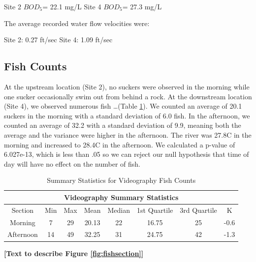 \documentclass{article}\usepackage[]{graphicx}\usepackage[]{color}
\begin{document}
\subitem Site 2 $BOD_5$= 22.1 mg/L 
\subitem Site 4 $BOD_5$= 27.3 mg/L 

The average recorded water flow velocities were:

\subitem Site 2: 0.27 ft/sec
\subitem Site 4: 1.09 ft/sec 

\subsection{Fish Counts}



At the upstream location (Site 2), no suckers were observed in the morning while one sucker occasionally swim out from behind a rock. At the downstream location (Site 4), we observed numerous fish \ldots (Table \ref{tab:fishcounts}). We counted an average of 20.1 suckers in the morning with a standard deviation of 6.0 fish.  In the afternoon, we counted an average of 32.2 with a standard deviation of 9.9, meaning both the average and the variance were higher in the afternoon.  The river was 27.8\textdegree C in the morning and increased to 28.4\textdegree C in the afternoon.  We calculated a p-value of 6.027e-13, which is less than .05 so we can reject our null hypothesis that time of day will have no effect on the number of fish.

\begin{table}
\caption{Summary Statistics for Videography Fish Counts}
\begin{tabular}{cccccccc}
 \hline
 \multicolumn{8}{c}{Videography Summary Statistics} \\
 \hline
 Section & Min & Max & Mean & Median & 1st Quartile & 3rd Quartile & K\\
 \hline
 Morning & 7 & 29 & 20.13 & 22  & 16.75 & 25 & -0.6\\
 Afternoon & 14 & 49 & 32.25 & 31 & 24.75 &  42 & -1.3\\
 \hline
\end{tabular}
\label{tab:fishcounts}
\end{table}

\textbf{[Text to describe Figure \ref{fig:fishsection}]}
\end{document}
